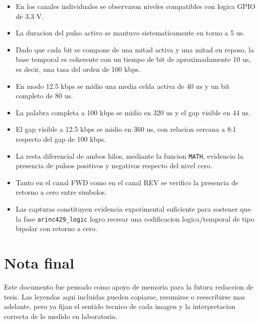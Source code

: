 \documentclass[12pt,a4paper]{article}
\begin{document}
\begin{itemize}
    \item En los canales individuales se observaron niveles compatibles con logica GPIO de 3.3 V.
    \item La duracion del pulso activo se mantuvo sistematicamente en torno a 5 us.
    \item Dado que cada bit se compone de una mitad activa y una mitad en reposo, la base temporal es coherente con un tiempo de bit de aproximadamente 10 us, es decir, una tasa del orden de 100 kbps.
    \item En modo 12.5 kbps se midio una media celda activa de 40 us y un bit completo de 80 us.
    \item La palabra completa a 100 kbps se midio en 320 us y el gap visible en 44 us.
    \item El gap visible a 12.5 kbps se midio en 360 us, con relacion cercana a 8:1 respecto del gap de 100 kbps.
    \item La resta diferencial de ambos hilos, mediante la funcion \texttt{MATH}, evidencio la presencia de pulsos positivos y negativos respecto del nivel cero.
    \item Tanto en el canal FWD como en el canal REV se verifico la presencia de retorno a cero entre simbolos.
    \item Las capturas constituyen evidencia experimental suficiente para sostener que la fase \texttt{arinc429\_logic} logro recrear una codificacion logica/temporal de tipo bipolar con retorno a cero.
\end{itemize}

\section{Nota final}

Este documento fue pensado como apoyo de memoria para la futura redaccion de tesis. Las leyendas aqui incluidas pueden copiarse, resumirse o reescribirse mas adelante, pero ya fijan el sentido tecnico de cada imagen y la interpretacion correcta de lo medido en laboratorio.
\end{document}
